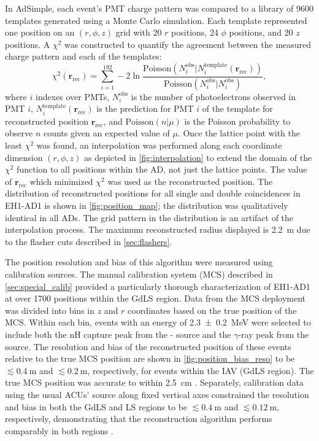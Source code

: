 In AdSimple,
each event's PMT charge pattern was compared to a library of \num{9600} templates
generated using a Monte Carlo simulation.
Each template represented one position on an $(r, \phi, z)$ grid
with \num{20} $r$ positions, \num{24} $\phi$ positions,
and \num{20} $z$ positions.
A $\chi^2$ was constructed to quantify the agreement between the measured charge pattern
and each of the templates:
\begin{equation}
    \chi^2(\textbf{r}_{\text{rec}}) = \sum_{i=1}^{192} -2\ln\frac{
        \text{Poisson}(N_i^{\text{obs}} \vert N_i^{\text{template}}(\textbf{r}_{\text{rec}}))
    }
    {
        \text{Poisson}(N_i^{\text{obs}} \vert N_i^{\text{obs}})
    },
\end{equation}
where $i$ indexes over PMTs,
$N_i^{\text{obs}}$ is the number of photoelectrons observed in PMT $i$,
$N_{i}^{\text{template}}(\textbf{r}_{\text{rec}})$ is the prediction
for PMT $i$ of the template for reconstructed position $\textbf{r}_{\text{rec}}$,
and $\text{Poisson}(n\vert\mu)$ is the Poisson probability
to observe $n$ counts given an expected value of $\mu$.
Once the lattice point with the least $\chi^2$ was found,
an interpolation was performed along each coordinate dimension $(r, \phi, z)$
as depicted in \cref{fig:interpolation}
to extend the domain of the $\chi^2$ function to all positions within the AD,
not just the lattice points.
The value of $\textbf{r}_{\text{rec}}$ which minimized $\chi^2$
was used as the reconstructed position.
The distribution of reconstructed positions
for all single and double coincidences in EH1-AD1
is shown in \cref{fig:position_map};
the distribution was qualitatively identical in all ADs.
The grid pattern in the distribution is an artifact of the interpolation process.
The maximum reconstructed radius displayed is \SI{2.2}{\m}
due to the flasher cuts described in \cref{sec:flashers}.

The position resolution and bias of this algorithm were measured
using calibration sources.
The manual calibration system (MCS) described in \cref{sec:special_calib}
provided a particularly thorough characterization of EH1-AD1
at over 1700 positions within the GdLS region.
Data from the MCS deployment was divided into bins in $z$ and $r$ coordinates
based on the true position of the MCS.
Within each bin, events with an energy of \SI{2.3\pm0.2}{\MeV} were selected
to include both the nH capture peak from the - source
and the $\gamma$-ray peak from the  source.
The resolution and bias of the reconstructed position of these events
relative to the true MCS position
are shown in \cref{fig:position_bias_reso}
to be $\lesssim\SI{0.4}{\m}$ and $\lesssim\SI{0.2}{\m}$, respectively,
for events within the IAV (GdLS region).
The true MCS position was accurate to within \SI{2.5}{\cm} \cite{mcs}.
Separately, calibration data using the usual ACUs'  source
along fixed vertical axes
constrained the resolution and bias in both the GdLS and LS regions
to be $\lesssim\SI{0.4}{\m}$ and $\lesssim\SI{0.12}{\m}$, respectively,
demonstrating that the reconstruction algorithm performs comparably
in both regions \cite{adtime_performance}.


